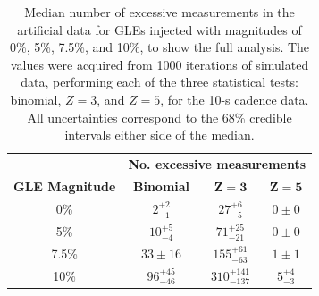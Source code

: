 \vspace{1em}
%
\begin{table}[ht!]
	\begin{center}
		\caption{Median number of excessive measurements in the artificial data for GLEs injected with magnitudes of 0\%, 5\%, 7.5\%, and 10\%, to show the full analysis. The values were acquired from 1000 iterations of simulated data, performing each of the three statistical tests: binomial, $Z=3$, and $Z=5$, for the 10-s cadence data. All uncertainties correspond to the 68\% credible intervals either side of the median.}
		\label{tab:HS_14008_sims_to_10}
		\begin{tabular}{c c c c}
			\hline 
			{} & \multicolumn{3}{c}{\bf No. excessive measurements} \\ 
			{\bf GLE Magnitude} & {\bf Binomial} & {\bf $\mathbf{Z=3}$} & {\bf $\mathbf{Z=5}$}  \\ 
			\hline 
			0\% & $2^{+2}_{-1}$ & $27^{+6}_{-5}$ & $0 \pm 0$ \\ 
			5\% & $10^{+5}_{-4}$ & $71^{+25}_{-21}$ & $0 \pm 0$ \\ 
			7.5\% & $33 \pm 16$ & $155^{+61}_{-63}$ & $1 \pm 1$ \\ 
			10\% & $96^{+45}_{-46}$ & $310^{+141}_{-137}$ & $5^{+4}_{-3}$ \\ 
			\hline 
			

%			
%			
			\hline 
		\end{tabular} 
	\end{center}
\end{table}
%
\vspace{1em}


